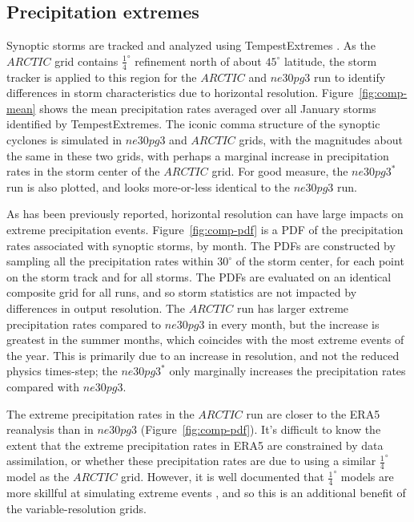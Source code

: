 \documentclass[draft]{agujournal2019}
\begin{document}
\subsection{Precipitation extremes}

Synoptic storms are tracked and analyzed using TempestExtremes \cite{UETAL2021}. As the $ARCTIC$ grid contains $\frac{1}{4}^{\circ}$ refinement north of about $45^{\circ}$ latitude, the storm tracker is applied to this region for the $ARCTIC$ and $ne30pg3$ run to identify differences in storm characteristics due to horizontal resolution. Figure~\ref{fig:comp-mean} shows the mean precipitation rates averaged over all January storms identified by TempestExtremes. The iconic comma structure of the synoptic cyclones is simulated in $ne30pg3$ and $ARCTIC$ grids, with the magnitudes about the same in these two grids, with perhaps a marginal increase in precipitation rates in the storm center of the $ARCTIC$ grid. For good measure, the $ne30pg3^{*}$ run is also plotted, and looks more-or-less identical to the $ne30pg3$ run.

As has been previously reported, horizontal resolution can have large impacts on extreme precipitation events. Figure~\ref{fig:comp-pdf} is a PDF of the precipitation rates associated with synoptic storms, by month. The PDFs are constructed by sampling all the precipitation rates within $30^{\circ}$ of the storm center, for each point on the storm track and for all storms. The PDFs are evaluated on an identical composite grid for all runs, and so storm statistics are not impacted by differences in output resolution. The $ARCTIC$ run has larger extreme precipitation rates compared to $ne30pg3$ in every month, but the increase is greatest in the summer months, which coincides with the most extreme events of the year. This is primarily due to an increase in resolution, and not the reduced physics times-step; the $ne30pg3^{*}$ only marginally increases the precipitation rates compared with $ne30pg3$.

The extreme precipitation rates in the $ARCTIC$ run are closer to the ERA5 reanalysis than in $ne30pg3$ (Figure~\ref{fig:comp-pdf}). It's difficult to know the extent that the extreme precipitation rates in ERA5 are constrained by data assimilation, or whether these precipitation rates are due to using a similar $\frac{1}{4}^{\circ}$ model as the $ARCTIC$ grid. However, it is well documented that $\frac{1}{4}^{\circ}$ models are more skillful at simulating extreme events \cite{BetAl2013JC,OETAL2016JAMES}, and so this is an additional benefit of the variable-resolution grids.
\end{document}
